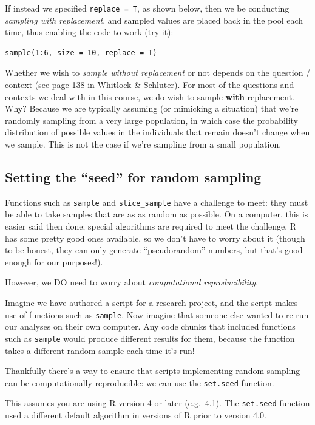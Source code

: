 \documentclass[
]{book}
\begin{document}
If instead we specified \texttt{replace\ =\ T}, as shown below, then we be conducting \emph{sampling with replacement}, and sampled values are placed back in the pool each time, thus enabling the code to work (try it):

\begin{verbatim}
sample(1:6, size = 10, replace = T)
\end{verbatim}

Whether we wish to \emph{sample without replacement} or not depends on the question / context (see page 138 in Whitlock \& Schluter). For most of the questions and contexts we deal with in this course, we do wish to sample \textbf{with} replacement. Why? Because we are typically assuming (or mimicking a situation) that we're randomly sampling from a very large population, in which case the probability distribution of possible values in the individuals that remain doesn't change when we sample. This is not the case if we're sampling from a small population.

\subsection{Setting the ``seed'' for random sampling}\label{setseed}

Functions such as \texttt{sample} and \texttt{slice\_sample} have a challenge to meet: they must be able to take samples that are as as random as possible. On a computer, this is easier said then done; special algorithms are required to meet the challenge. R has some pretty good ones available, so we don't have to worry about it (though to be honest, they can only generate ``pseudorandom'' numbers, but that's good enough for our purposes!).

However, we DO need to worry about \emph{computational reproducibility}.

Imagine we have authored a script for a research project, and the script makes use of functions such as \texttt{sample}. Now imagine that someone else wanted to re-run our analyses on their own computer. Any code chunks that included functions such as \texttt{sample} would produce different results for them, because the function takes a different random sample each time it's run!

Thankfully there's a way to ensure that scripts implementing random sampling can be computationally reproducible: we can use the \texttt{set.seed} function.

This assumes you are using R version 4 or later (e.g.~4.1). The \texttt{set.seed} function used a different default algorithm in versions of R prior to version 4.0.
\end{document}
